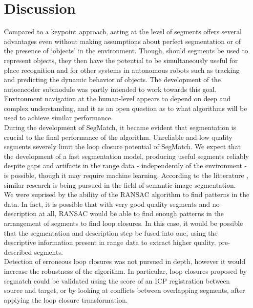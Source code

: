 \chapter{Discussion}
\label{chap:discussion}

Compared to a keypoint approach, acting at the level of segments offers several advantages even without making assumptions about perfect segmentation or of the presence of `objects' in the environment. Though, should segments be used to represent objects, they then have the potential to be simultaneously useful for place recognition and for other systems in autonomous robots such as tracking and predicting the dynamic behavior of objects. The development of the autoencoder submodule was partly intended to work towards this goal. Environment navigation at the human-level appears to depend on deep and complex understanding, and it as an open question as to what algorithms will be used to achieve similar performance.\\

During the development of SegMatch, it became evident that segmentation is crucial to the final performance of the algorithm. Unreliable and low quality segments severely limit the loop closure potential of SegMatch. We expect that the development of a fast segmentation model, producing useful segments reliably despite gaps and artifacts in the range data - independently of the environment - is possible, though it may require machine learning. According to the litterature \cite{semantic}, similar research is being pursued in the field of semantic image segmentation.\\

We were suprised by the ability of the RANSAC algorithm to find patterns in the data. In fact, it is possible that with very good quality segments and no description at all, RANSAC would be able to find enough patterns in the arrangement of segments to find loop closures. In this case, it would be possible that the segmentation and description step be fused into one, using the descriptive information present in range data to extract higher quality, pre-described segments.\\

Detection of erroneous loop closures was not pursued in depth, however it would increase the robustness of the algorithm. In particular, loop closures proposed by segmatch could be validated using the score of an ICP registration between source and target, or by looking at conflicts between overlapping segments, after applying the loop closure transformation.\\

